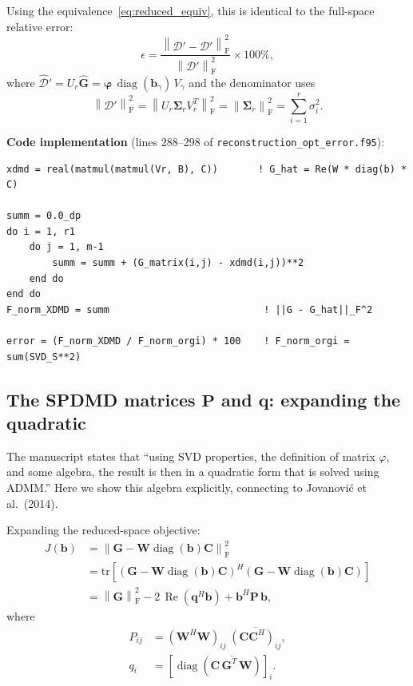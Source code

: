\documentclass[11pt,a4paper]{article}
\newcommand{\norm}[1]{\left\lVert #1 \right\rVert}
\newcommand{\Fro}{\mathrm{F}}
\newcommand{\diag}{\operatorname{diag}}
\newcommand{\Reop}{\operatorname{Re}}
\newcommand{\Sigmat}{\bm{\Sigma}}
\begin{document}
Using the equivalence~\eqref{eq:reduced_equiv}, this is identical to the full-space relative error:
\begin{equation}
\epsilon = \frac{\norm{\mathcal{D}' - \hat{\mathcal{D}}'}_\Fro^2}{\norm{\mathcal{D}'}_\Fro^2} \times 100\%,
\end{equation}
where $\hat{\mathcal{D}}' = U_r \hat{\bm{G}} = \bm{\varphi}\,\diag(\bm{b}_\gamma)\,V_\gamma$ and the denominator uses
\[
\norm{\mathcal{D}'}_\Fro^2 = \norm{U_r \Sigmat_r V_r^T}_\Fro^2 = \norm{\Sigmat_r}_\Fro^2 = \sum_{i=1}^{r} \sigma_i^2.
\]

\medskip\noindent
\textbf{Code implementation} (lines 288--298 of \texttt{reconstruction\_opt\_error.f95}):
\begin{verbatim}
xdmd = real(matmul(matmul(Vr, B), C))       ! G_hat = Re(W * diag(b) * C)

summ = 0.0_dp
do i = 1, r1
    do j = 1, m-1
        summ = summ + (G_matrix(i,j) - xdmd(i,j))**2
    end do
end do
F_norm_XDMD = summ                           ! ||G - G_hat||_F^2

error = (F_norm_XDMD / F_norm_orgi) * 100    ! F_norm_orgi = sum(SVD_S**2)
\end{verbatim}

\subsection{The SPDMD matrices \texorpdfstring{$\bm{P}$}{P} and \texorpdfstring{$\bm{q}$}{q}: expanding the quadratic}

The manuscript states that ``using SVD properties, the definition of matrix $\varphi$, and some algebra, the result is then in a quadratic form that is solved using ADMM.''  Here we show this algebra explicitly, connecting to Jovanovi\'c et al.\ (2014).

Expanding the reduced-space objective:
\begin{align}
J(\bm{b}) &= \norm{\bm{G} - \bm{W}\diag(\bm{b})\bm{C}}_\Fro^2 \nonumber\\
&= \mathrm{tr}\!\left[(\bm{G} - \bm{W}\diag(\bm{b})\bm{C})^H (\bm{G} - \bm{W}\diag(\bm{b})\bm{C})\right] \nonumber\\
&= \norm{\bm{G}}_\Fro^2 - 2\,\Reop(\bm{q}^H \bm{b}) + \bm{b}^H \bm{P}\, \bm{b}, \label{eq:quadratic}
\end{align}
where
\begin{align}
P_{ij} &= (\bm{W}^H \bm{W})_{ij}\;\overline{(\bm{C}\bm{C}^H)_{ij}}, \label{eq:P_def}\\
q_i &= \left[\diag\!\left(\overline{\bm{C}\,\bm{G}^T\,\bm{W}}\right)\right]_i. \label{eq:q_def}
\end{align}
\end{document}
